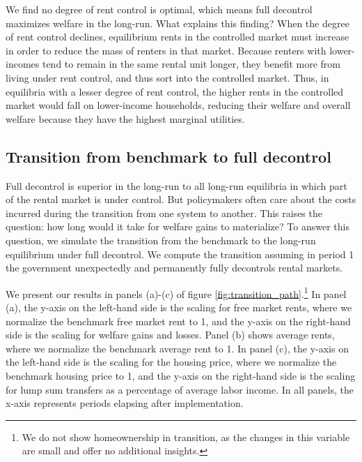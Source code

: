 \documentclass[parskip=full]{article}
\begin{document}
We find no degree of rent control is optimal, which means full decontrol maximizes welfare in the long-run. What explains this finding? When the degree of rent control declines, equilibrium rents in the controlled market must increase in order to reduce the mass of renters in that market. Because renters with lower-incomes tend to remain in the same rental unit longer, they benefit more from living under rent control, and thus sort into the controlled market. Thus, in equilibria with a lesser degree of rent control, the higher rents in the controlled market would fall on lower-income households, reducing their welfare and overall welfare because they have the highest marginal utilities.

\subsection{Transition from benchmark to full decontrol}

Full decontrol is superior in the long-run to all long-run equilibria in which part of the rental market is under control. But policymakers often care about the costs incurred during the transition from one system to another. This raises the question: how long would it take for welfare gains to materialize? To answer this question, we simulate the transition from the benchmark to the long-run equilibrium under full decontrol. We compute the transition assuming in period 1 the government unexpectedly and permanently fully decontrols rental markets. 

We present our results in panels (a)-(c) of figure \ref{fig:transition_path}.\footnote{We do not show homeownership in transition, as the changes in this variable are small and offer no additional insights.} In panel (a), the y-axis on the left-hand side is the scaling for free market rents, where we normalize the benchmark free market rent to 1, and the y-axis on the right-hand side is the scaling for welfare gains and losses. Panel (b) shows average rents, where we normalize the benchmark average rent to 1. In panel (c), the y-axis on the left-hand side is the scaling for the housing price, where we normalize the benchmark housing price to 1, and the y-axis on the right-hand side is the scaling for lump sum transfers as a percentage of average labor income. In all panels, the x-axis represents periods elapsing after implementation.
\end{document}
